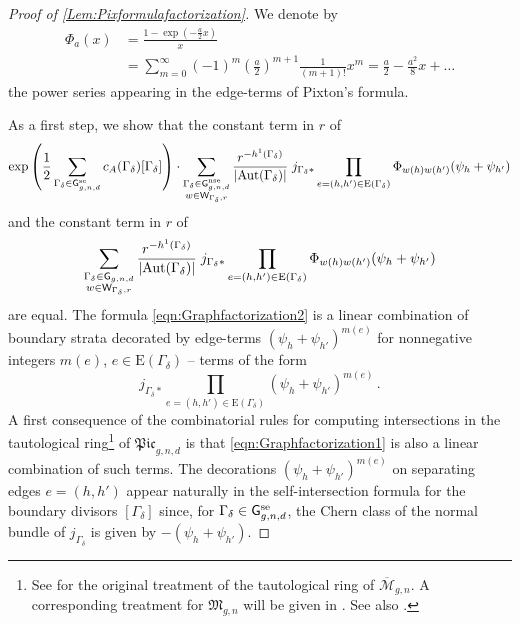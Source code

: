 \documentclass[a4paper,12pt]{article} %
\def\Aut{{\rm Aut}}
\def\E{\mathrm{E}}
\def\G{\mathsf{G}}
\theoremstyle{definition}
\theoremstyle{plain}%
\newcommand{\Picabs}{\mathfrak{Pic}}
\begin{document}
\begin{proof}[Proof of \cref{Lem:Pixformulafactorization}]
We denote by
\begin{align*} 
\Phi_{a}(x)&= \frac{1-\exp({-\frac{a}{2}}x)}{x}\\ &= \sum_{m=0}^\infty (-1)^m (\frac{a}{2})^{m+1} \frac{1}{(m+1)!}x^m = \frac{a}{2} - \frac{a^2}{8} x + \ldots 
\end{align*}
the power series appearing in the edge-terms of Pixton's formula. 

As a first step, we show that the constant term in $r$ of
\begin{equation} \label{eqn:Graphfactorization1}
    \exp\left(\frac12  \sum_{\Gamma_\delta \in \G_{g,n,d}^\textup{se}} c_A(\Gamma_\delta) [\Gamma_\delta]  \right) \cdot \sum_{
\substack{\Gamma_\delta\in \G_{g,n,d}^\textup{nse} \\
w\in \mathsf{W}_{\Gamma_\delta,r}}
}
\frac{r^{-h^1(\Gamma_\delta)}}{|\Aut(\Gamma_\delta)| }
\;
j_{\Gamma_\delta*} \prod_{e=(h,h')\in \E(\Gamma_\delta)}
 \Phi_{w(h)w(h')}(\psi_h+\psi_{h'})
\end{equation}
and the constant term in $r$ of
\begin{equation} \label{eqn:Graphfactorization2}
\sum_{
\substack{\Gamma_\delta\in \G_{g,n,d} \\
w\in \mathsf{W}_{\Gamma_\delta,r}}
}
\frac{r^{-h^1(\Gamma_\delta)}}{|\Aut(\Gamma_\delta)| }
\;
j_{\Gamma_\delta*} \prod_{e=(h,h')\in \E(\Gamma_\delta)}
 \Phi_{w(h)w(h')}(\psi_h+\psi_{h'})
\end{equation}
are equal. The formula \eqref{eqn:Graphfactorization2} is a linear combination of boundary strata decorated by edge-terms $(\psi_h + \psi_{h'})^{m(e)}$ for nonnegative integers $m(e)$, $e \in \E(\Gamma_\delta)$ -- terms of the form
\begin{equation} \label{eqn:Graphfactorization3}
 j_{\Gamma_\delta*} \prod_{e=(h,h')\in \E(\Gamma_\delta)}
 (\psi_h+\psi_{h'})^{m(e)}\, .
\end{equation}
A first consequence of the combinatorial rules for computing intersections in the tautological ring\footnote{See \cite{GraberPandharipande} for the original treatment of the tautological ring of $\overline{\mathcal{M}}_{g,n}$. A corresponding treatment for $\mathfrak{M}_{g,n}$ will be given in \cite{BaeSchmitt1, BaeSchmitt2}. See also \cite[Sections 1.1, 1.7]{Janda2018Double-ramifica}.} of $\Picabs_{g,n,d}$ is that \eqref{eqn:Graphfactorization1} is also a linear combination of such terms. The decorations $(\psi_h+\psi_{h'})^{m(e)}$ on separating edges $e=(h,h')$ appear naturally in the self-intersection formula for the boundary divisors $[\Gamma_\delta]$ since, for $\Gamma_\delta \in \G_{g,n,d}^\textup{se}$, the Chern class of the normal bundle of $j_{\Gamma_\delta}$ is given by $- (\psi_h + \psi_{h'})$.


\end{proof}
\end{document}
